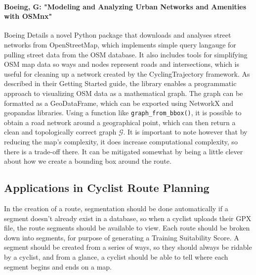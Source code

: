 \documentclass[12pt,a4paper]{report}
\begin{document}
\paragraph{Boeing, G: "Modeling and Analyzing Urban Networks and Amenities with OSMnx"}
Boeing Details a novel Python package that downloads and analyses street networks from OpenStreetMap, which implements simple query langauge for pulling street data from the OSM database. It also includes tools for simplifying OSM map data so
ways and nodes represent roads and intersections, which is useful for cleaning up a network created by the CyclingTrajectory framework.
As described in their Getting Started guide, the library enables a programmatic approach to visualizing OSM data as a mathematical graph. The graph
can be formatted as a GeoDataFrame, which can be exported using NetworkX and geopandas libraries. Using a function like \texttt{graph_from_bbox()}, it is possible
to obtain a road network around a geographical point, which can then return a clean and topologically correct graph $\mathcal{G}$.
It is important to note however that by reducing the map's complexity, it does increase computational complexity, so there is a trade-off there.
It can be mitigated somewhat by being a little clever about how we create a bounding box around the route.


\subsection{Applications in Cyclist Route Planning}
In the creation of a route, segmentation should be done automatically if a segment doesn't already exist in a database, so when a cyclist uploads their GPX file,
the route segments should be available to view.
Each route should be broken down into segments, for purpose of generating a Training Suitability Score.
A segment should be created from a series of ways, so they should always be ridable by a cyclist, and from a glance, a cyclist should be able to tell
where each segment begins and ends on a map.
\end{document}
